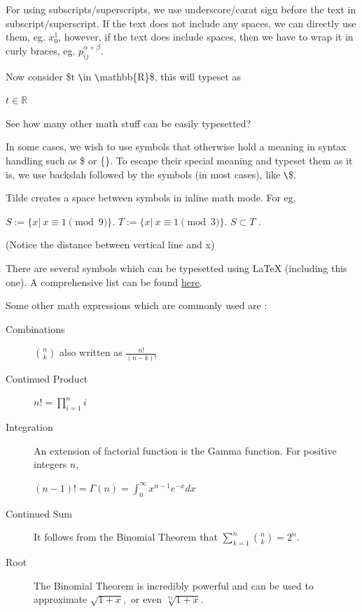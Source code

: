 \documentclass{article}
\theoremstyle{remark}
\begin{document}
    For using subscripts/superscripts, we use underscore/carat sign before the text in subscript/superscript. If the text does not 
    include any spaces, we can directly use them, eg. $x_0^1$, however, if the text does include spaces, then we have to wrap it in curly braces, eg. 
    $p^{\alpha + \beta}_{ij}$.

    Now consider \$t \verb!\!in \verb!\!mathbb\{R\}\$, this will typeset as
    
    \begin{center}
        $t \in \mathbb{R}$
    \end{center}
    
    See how many other math stuff can be easily typesetted?

    In some cases, we wish to use symbols that otherwise hold a meaning in syntax handling such as
    \$ or \{\}. To escape their special meaning and typeset them as it is, we use backslah followed by the symbols
    (in most cases), like \verb!\!\$.
    
    Tilde creates a space between symbols in inline math mode. For eg.
    
    \begin{center}
        $S :=\{x|~x\equiv 1 \pmod{9}\}$. $T :=\{x|~x \equiv 1\pmod{3}\}$. $S \subset T$ .
    \end{center} (Notice the distance between vertical line and x)

    There are several symbols which can be typesetted using \LaTeX{} (including this one). A comprehensive
    list can be found \href{https://oeis.org/wiki/List_of_LaTeX_mathematical_symbols}{here}.

    Some other math expressions which are commonly used are : 
    \begin{description}
        \item[Combinations] $\binom{n}{k}$ also written as $\frac{n!}{(n-k)!}$
        \item[Continued Product] $n!=\prod_{i=1}^{n} i $ 
        \item[Integration] An extension of factorial function is the Gamma function. For positive integers $n$,
            \begin{center}
                $(n-1)! = \Gamma(n)=\int_{0}^{\infty}x^{n-1}e^{-x}dx$ 
            \end{center}
        \item[Continued Sum] It follows from the Binomial Theorem that $\sum_{k=1}^{n}\binom{n}{k}=2^n$.
        \item[Root] The Binomial Theorem is incredibly powerful and can be used to approximate $\sqrt{1+x},$ 
        or even $\sqrt[71]{1+x}$.
    \end{description}
\end{document}
